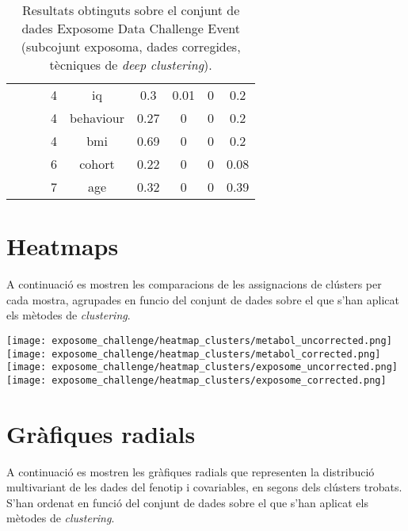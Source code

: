 \documentclass[CAT,BIB]{TFUOC}%
\begin{document}
\begin{table}
\begin{tabular}{@{}ccccccccc@{}}
            &  &  & 4 & iq & 0.3 & 0.01 & 0 & 0.2 \\
            &  &  & 4 & behaviour & 0.27 & 0 & 0 & 0.2 \\
            &  &  & 4 & bmi & 0.69 & 0 & 0 & 0.2 \\
            &  &  & 6 & cohort & 0.22 & 0 & 0 & 0.08 \\
            &  &  & 7 & age & 0.32 & 0 & 0 & 0.39 \\ \bottomrule
        \end{tabular}
        \caption[Exposome Data Challenge Event: resultats - part 10]{
            Resultats obtinguts sobre el conjunt de dades Exposome Data Challenge Event
            (subcojunt exposoma, dades corregides, tècniques de \textit{deep clustering}).
        }
        \label{t:results_exposome10}
    \end{table}

    \clearpage

    \section{Heatmaps}

    A continuació es mostren les comparacions
    de les assignacions de clústers per cada mostra,
    agrupades en funcio del conjunt de dades
    sobre el que s'han aplicat els mètodes de \textit{clustering}.

    \begin{center}
        \texttt{[image: exposome\_challenge/heatmap\_clusters/metabol\_uncorrected.png]}
        \texttt{[image: exposome\_challenge/heatmap\_clusters/metabol\_corrected.png]}
        \texttt{[image: exposome\_challenge/heatmap\_clusters/exposome\_uncorrected.png]}
        \texttt{[image: exposome\_challenge/heatmap\_clusters/exposome\_corrected.png]}
    \end{center}

    \clearpage

    \section{Gràfiques radials}

        A continuació es mostren les gràfiques radials
        que representen la distribució multivariant
        de les dades del fenotip i covariables,
        en segons dels clústers trobats.
        S'han ordenat en funció del conjunt de dades
        sobre el que s'han aplicat els mètodes de \textit{clustering}.
\end{document}

